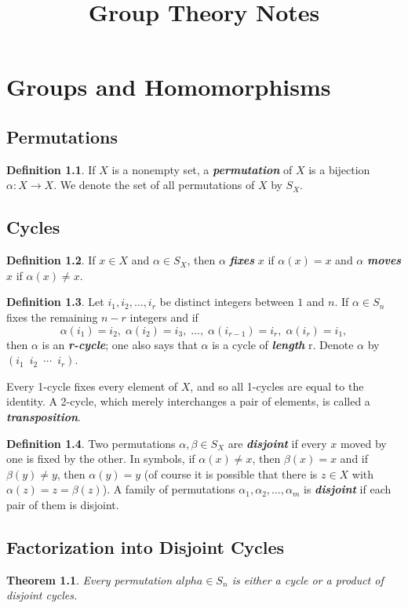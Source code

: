 \documentclass[12pt]{report}
\title{Group Theory Notes}
\newtheorem{theorem}{Theorem}[chapter]
\theoremstyle{definition}
\newtheorem*{definition}{Definition}
\newcommand{\term}[1]{\textbf{\textit{#1}}}
\begin{document}
\chapter{Groups and Homomorphisms}
\section{Permutations}
\begin{definition}
	If $X$ is a nonempty set, a \term{permutation} of $X$ is a bijection $\alpha:X\to X$. We denote the set of all permutations of $X$ by $S_X$.
\end{definition}

\section{Cycles}
\begin{definition}
	If $x\in X$ and $\alpha\in S_X$, then $\alpha$ \term{fixes} $x$ if $\alpha(x)=x$ and $\alpha$ \term{moves} $x$ if $\alpha(x)\neq x$.
\end{definition}

\begin{definition}
	Let $i_1, i_2, \dots, i_r$ be distinct integers between $1$ and $n$. If $\alpha\in S_n$ fixes the remaining $n-r$ integers and if
	\[ \alpha(i_1)=i_2,\;\alpha(i_2)=i_3,\;\dots,\;\alpha(i_{r-1})=i_r,\;\alpha(i_r)=i_1, \]
	then $\alpha$ is an \term{r-cycle}; one also says that $\alpha$ is a cycle of \term{length} r. Denote $\alpha$ by $(i_1\enspace i_2\enspace \cdots \enspace i_r)$.
	\smallskip

	Every 1-cycle fixes every element of $X$, and so all 1-cycles are equal to the identity. A 2-cycle, which merely interchanges a pair of elements, is called a \term{transposition}.
\end{definition}

\begin{definition}
	Two permutations $\alpha, \beta\in S_X$ are \term{disjoint} if every $x$ moved by one is fixed by the other.
	In symbols, if $\alpha(x)\neq x$, then $\beta(x)=x$ and if $\beta(y)\neq y$, then $\alpha(y)=y$
	(of course it is possible that there is $z\in X$ with $\alpha(z)=z=\beta(z)$).
	A family of permutations $\alpha_1,\alpha_2,\dots,\alpha_m$ is \term{disjoint} if each pair of them is disjoint.
\end{definition}

\section{Factorization into Disjoint Cycles}
\begin{theorem}
	Every permutation $alpha\in S_n$ is either a cycle or a product of disjoint cycles.
\end{theorem}
\end{document}
